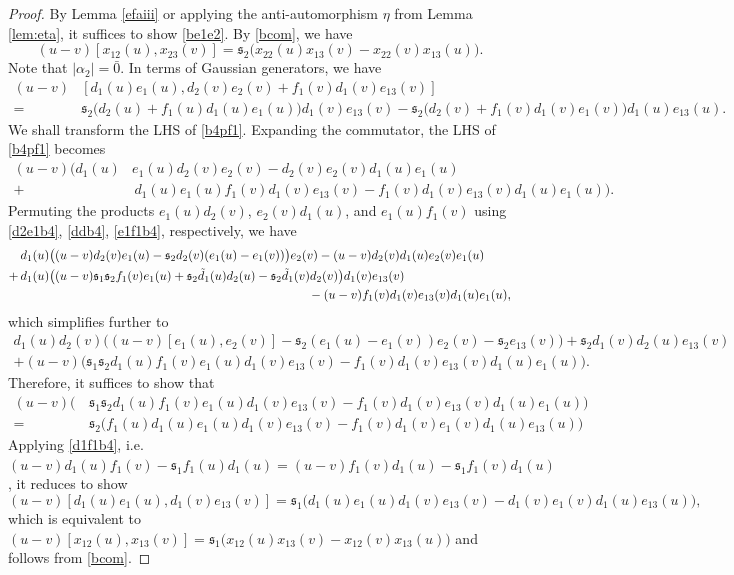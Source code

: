 \documentclass[11pt,reqno]{amsart}
\numberwithin{equation}{section}
\theoremstyle{definition}
\theoremstyle{remark}
\newcommand{\beq}{\begin{equation}}
\newcommand{\eeq}{\end{equation}}
\newcommand{\tl}{\tilde}
\newcommand{\ka}{{\mathfrak s}}
\begin{document}
\begin{proof}
By Lemma \ref{efaiii} or applying the anti-automorphism $\eta$ from Lemma \ref{lem:eta}, it suffices to show \eqref{be1e2}. By \eqref{bcom}, we have 
\[
(u-v)[x_{12}(u),x_{23}(v)]=\ka_2\big(x_{22}(u)x_{13}(v)-x_{22}(v)x_{13}(u)\big).
\]
Note that $|\alpha_2|=\bar 0$. In terms of Gaussian generators, we have
\beq\label{b4pf1}
\begin{split}
(u-v)&[d_1(u)e_1(u),d_2(v)e_2(v)+f_1(v)d_1(v)e_{13}(v)]\\=\, &\ka_2\big(d_2(u)+f_1(u)d_1(u)e_1(u)\big)d_1(v)e_{13}(v)-\ka_2\big(d_2(v)+f_1(v)d_1(v)e_1(v)\big)d_1(u)e_{13}(u).
\end{split}
\eeq
We shall transform the LHS of \eqref{b4pf1}. Expanding the commutator, the LHS of \eqref{b4pf1} becomes
\begin{align*}
(u-v)\Big(d_1(u)& e_1(u)d_2(v) e_2(v)-d_2(v) e_2(v)d_1(u) e_1(u)\\
+&\, d_1(u) e_1(u)f_1(v) d_1(v)e_{13}(v)-f_1(v)d_1(v)e_{13}(v)d_1(u)e_1(u)\Big).
\end{align*}
Permuting the products $e_1(u)d_2(v)$, $e_2(v)d_1(u)$, and $e_1(u)f_1(v)$ using \eqref{d2e1b4}, \eqref{ddb4}, \eqref{e1f1b4}, respectively, we have
\begin{align*}
&\,d_1(u) \big((u-v)d_2(v)e_1(u)-\ka_2d_2(v)(e_1(u)-e_1(v))\big) e_2(v)-(u-v)d_2(v) d_1(u)e_2(v) e_1(u)\\
+&\,d_1(u) \big((u-v)\ka_1\ka_2f_1(v)e_1(u)+\ka_2\tl d_1(u)d_2(u)-\ka_2\tl d_1(v)d_2(v)\big) d_1(v)e_{13}(v)\\
&\hskip8.2cm-(u-v)f_1(v)d_1(v)e_{13}(v)d_1(u)e_1(u),
\end{align*}
which simplifies further to
\begin{align*}
d_1(u)d_2(v)\big((u-v)[e_1(u),e_2(v)]-\ka_2(e_1(u)-e_1(v))e_2(v)-\ka_2e_{13}(v)\big)+\ka_2d_1(v)d_2(u)e_{13}(v)\\
+(u-v)\big(\ka_1\ka_2d_1(u)f_1(v)e_1(u)d_1(v)e_{13}(v)-f_1(v)d_1(v)e_{13}(v)d_1(u)e_1(u)\big).
\end{align*}
Therefore, it suffices to show that
\begin{align*}
(u-v)\big(&\,\ka_1\ka_2d_1(u)f_1(v)e_1(u)d_1(v)e_{13}(v)-f_1(v)d_1(v)e_{13}(v)d_1(u)e_1(u)\big)\\
=&\,\ka_2\big(f_1(u)d_1(u)e_1(u) d_1(v)e_{13}(v)- f_1(v)d_1(v)e_1(v) d_1(u)e_{13}(u)\big)
\end{align*}
Applying \eqref{d1f1b4}, i.e. $(u-v)d_1(u)f_1(v)-\ka_1f_1(u)d_1(u)=(u-v)f_1(v)d_1(u)-\ka_1f_1(v)d_1(u)$, it reduces to show
\beq\label{b4pf2}
(u-v)[d_1(u)e_1(u),d_1(v)e_{13}(v)]=\ka_1\big(d_1(u)e_1(u)d_1(v)e_{13}(v)-d_1(v)e_1(v)d_1(u)e_{13}(u)\big),
\eeq
which is equivalent to $(u-v)[x_{12}(u),x_{13}(v)]=\ka_1\big(x_{12}(u)x_{13}(v)-x_{12}(v)x_{13}(u)\big)$ and follows from \eqref{bcom}.
\end{proof}
\end{document}
